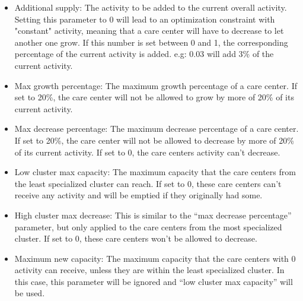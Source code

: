 \begin{itemize}
    \item Additional supply: The activity to be added to the current overall
          activity. Setting this parameter to 0 will lead to an optimization
          constraint with "constant" activity, meaning that a care center will have to
          decrease to let another one grow. If this number is set between 0 and 1, the
          corresponding percentage of the current activity is added. e.g: 0.03 will
          add 3\% of the current activity.
    \item Max growth percentage: The maximum growth percentage of a care center.
          If set to 20\%, the care center will not be allowed to grow by more of 20\%
          of its current activity.
    \item Max decrease percentage: The maximum decrease percentage of a care
          center. If set to 20\%, the care center will not be allowed to decrease by
          more of 20\% of its current activity. If set to 0, the care centers activity
          can't decrease.
    \item Low cluster max capacity: The maximum capacity that the care centers
          from the least specialized cluster can reach. If set to 0, these care
          centers can't receive any activity and will be emptied if they originally
          had some.
    \item High cluster max decrease: This is similar to the ``max decrease
          percentage'' parameter, but only applied to the care centers from the most
          specialized cluster. If set to 0, these care centers won't be allowed to
          decrease.
    \item Maximum new capacity: The maximum capacity that the care centers with
          0 activity can receive, unless they are within the least specialized
          cluster. In this case, this parameter will be ignored and ``low cluster max
          capacity'' will be used.
\end{itemize}

